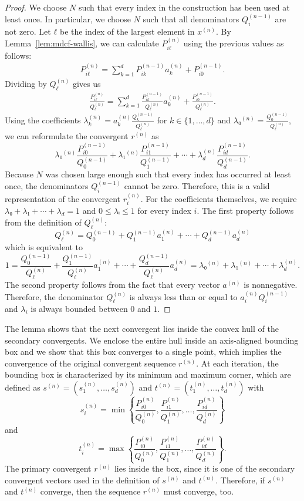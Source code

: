 \begin{proof}
  We choose $N$ such that every index in the construction has been used at least once.
  In particular, we choose $N$ such that all denominators $Q_i^{(n-1)}$ are not zero.
  Let $ℓ$ be the index of the largest element in $x^{(n)}$.
  By Lemma~\ref{lem:mdcf-wallis}, we can calculate $P_{iℓ}^{(n)}$ using the previous values as follows:
  \begin{align*}
    P_{iℓ}^{(n)} = \sum_{k = 1}^d P_{ik}^{(n-1)} a_k^{(n)} + P_{i0}^{(n-1)}.
  \end{align*}
  Dividing by $Q_ℓ^{(n)}$ gives us
  \begin{align*}
    \frac{P_{iℓ}^{(n)}}{Q_ℓ^{(n)}} = \sum_{k = 1}^d \frac{P_{ik}^{(n-1)}}{Q_ℓ^{(n)}} a_k^{(n)} + \frac{P_{i0}^{(n-1)}}{Q_ℓ^{(n)}}.
  \end{align*}
  Using the coefficients $λ_k^{(n)} = a_k^{(n)} \frac{Q_k^{(n-1)}}{Q_ℓ^{(n)}}$ for $k ∈ \{1, …, d\}$
  and $λ₀^{(n)} = \frac{Q_0^{(n-1)}}{Q_ℓ^{(n)}}$,
  we can reformulate the convergent $r^{(n)}$ as
  \[
    λ₀^{(n)} \frac{P_{i0}^{(n-1)}}{Q_0^{(n-1)}} + λ₁^{(n)} \frac{P_{i1}^{(n-1)}}{Q_1^{(n-1)}} + ⋯ + λ_d^{(n)} \frac{P_{id}^{(n-1)}}{Q_d^{(n-1)}}.
  \]
  Because $N$ was chosen large enough such that every index has occurred at least once,
  the denominators $Q_i^{(n-1)}$ cannot be zero.
  Therefore, this is a valid representation of the convergent $r_i^{(n)}$.
  For the coefficients themselves, we require $λ₀ + λ₁ + ⋯ + λ_d = 1$ and $0 ≤ λᵢ ≤ 1$ for every index $i$.
  The first property follows from the definition of $Q_ℓ^{(n)}$:
  \[
    Q_ℓ^{(n)} = Q_0^{(n-1)} + Q_1^{(n-1)} a_1^{(n)} + ⋯ + Q_d^{(n-1)} a_d^{(n)}
  \]
  which is equivalent to
  \[
    1 = \frac{Q_0^{(n-1)}}{Q_ℓ^{(n)}} + \frac{Q_1^{(n-1)}}{Q_ℓ^{(n)}} a_1^{(n)} + ⋯ + \frac{Q_d^{(n-1)}}{Q_ℓ^{(n)}} a_d^{(n)} = λ₀^{(n)} + λ₁^{(n)} + ⋯ + λ_d^{(n)}.
  \]
  The second property follows from the fact that every vector $a^{(n)}$ is nonnegative.
  Therefore, the denominator $Q_ℓ^{(n)}$ is always less than or equal to $a_i^{(n)} Q_i^{(n-1)}$ and
  $λ_i$ is always bounded between $0$ and $1$.
\end{proof}

The lemma shows that the next convergent lies inside the convex hull of the secondary convergents.
We enclose the entire hull inside an axis-aligned bounding box
and we show that this box converges to a single point,
which implies the convergence of the original convergent sequence $r^{(n)}$.
At each iteration, the bounding box is characterized by its minimum and maximum corner,
which are defined as $s^{(n)} = (s_1^{(n)}, …, s_d^{(n)})$ and $t^{(n)} = (t_1^{(n)}, …, t_d^{(n)})$ with
\[
  s_i^{(n)} = \min\left\{\frac{P_{i0}^{(n)}}{Q_0^{(n)}}, \frac{P_{i1}^{(n)}}{Q_1^{(n)}}, …, \frac{P_{id}^{(n)}}{Q_d^{(n)}}\right\}
\]
and
\[
  t_i^{(n)} = \max\left\{\frac{P_{i0}^{(n)}}{Q_0^{(n)}}, \frac{P_{i1}^{(n)}}{Q_1^{(n)}}, …, \frac{P_{id}^{(n)}}{Q_d^{(n)}}\right\}.
\]
The primary convergent $r^{(n)}$ lies inside the box,
since it is one of the secondary convergent vectors
used in the definition of $s^{(n)}$ and $t^{(n)}$.
Therefore, if $s^{(n)}$ and $t^{(n)}$ converge,
then the sequence $r^{(n)}$ must converge, too.

